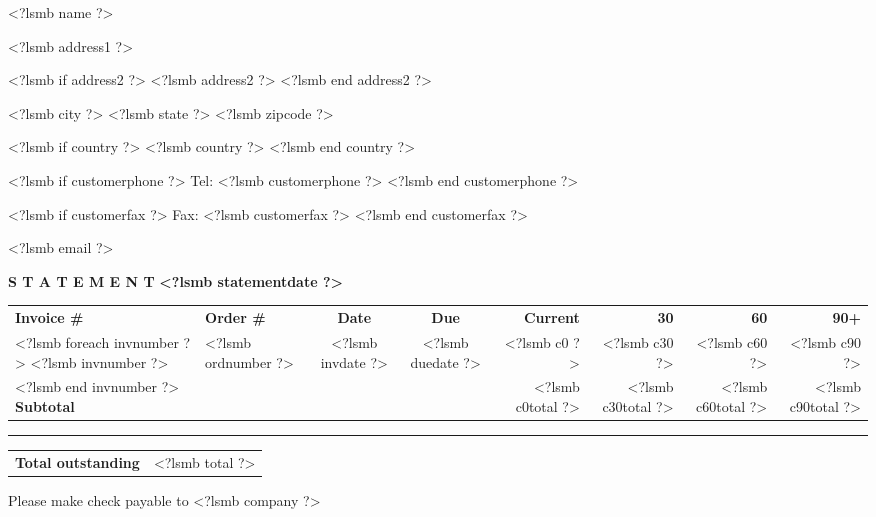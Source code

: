 \documentclass[twoside]{scrartcl}
\begin{document}
\newlength{\descrwidth}\setlength{\descrwidth}{10cm}

\newsavebox{\hdr}

\selectfont


\pagestyle{myheadings}

\fontsize{10pt}{12pt}\selectfont

\vspace*{1.5cm}

\parbox[t]{1cm}{\hfill}
\parbox[t]{10.5cm}{
  
<?lsmb name ?>

<?lsmb address1 ?>

<?lsmb if address2 ?>
<?lsmb address2 ?>
<?lsmb end address2 ?>

<?lsmb city ?> <?lsmb state ?> <?lsmb zipcode ?>

<?lsmb if country ?>
<?lsmb country ?>
<?lsmb end country ?>

}
\parbox[t]{7.5cm}{
<?lsmb if customerphone ?>
Tel: <?lsmb customerphone ?>
<?lsmb end customerphone ?>

<?lsmb if customerfax ?>
Fax: <?lsmb customerfax ?>
<?lsmb end customerfax ?>

<?lsmb email ?>
}
\hfill

\vspace{1cm}

\textbf{S T A T E M E N T} \hfill \textbf{<?lsmb statementdate ?>}

\vspace{2cm}

\begin{tabular*}{\textwidth}{@{}ll@{\extracolsep\fill}ccrrrr@{}}
  \textbf{Invoice \#} & \textbf{Order \#} & \textbf{Date} & \textbf{Due} &
  \textbf{Current} & \textbf{30} & \textbf{60} & \textbf{90+} \\
<?lsmb foreach invnumber ?>
  <?lsmb invnumber ?> & <?lsmb ordnumber ?> & <?lsmb invdate ?> & <?lsmb duedate ?> &
  <?lsmb c0 ?> & <?lsmb c30 ?> & <?lsmb c60 ?> & <?lsmb c90 ?> \\
<?lsmb end invnumber ?>
\textbf{Subtotal} & & & & <?lsmb c0total ?> & <?lsmb c30total ?> & <?lsmb c60total ?> & <?lsmb c90total ?>
\end{tabular*}
\rule{\textwidth}{1pt}

\vspace{0.5cm}

\hfill
\begin{tabularx}{7cm}{Xr@{}}
  \textbf{Total outstanding} & <?lsmb total ?>
\end{tabularx}

\vfill

Please make check payable to <?lsmb company ?>
\end{document}
